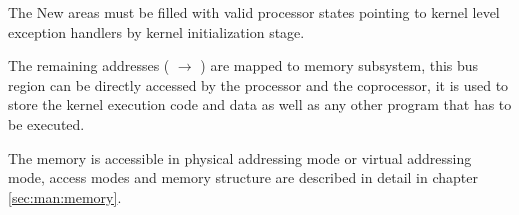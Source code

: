 The New areas must be filled with valid processor states pointing to kernel level exception handlers by kernel initialization stage.


The remaining addresses ( $\rightarrow$ ) are mapped to memory subsystem, this bus region can be directly accessed by the processor and the coprocessor, it is used to store the kernel execution code and data as well as any other program that has to be executed.

The memory is accessible in physical addressing mode or virtual addressing mode, access modes and memory structure are described in detail in chapter \ref{sec:man:memory}.

